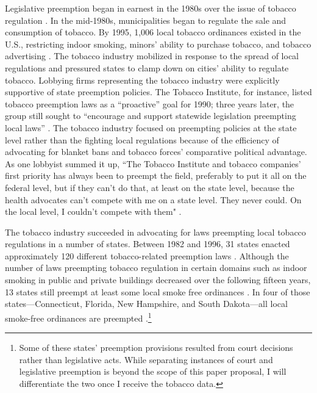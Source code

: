\documentclass[12pt]{article}
\begin{document}
Legislative preemption began in earnest in the 1980s over the issue of tobacco regulation \parencite{hicksHomeRuleBe2018,riverstone-newellRiseStatePreemption2017,nationalcancerinstituteStateLocalLegislative2000}. In the mid-1980s, municipalities began to regulate the sale and consumption of tobacco. By 1995, 1,006 local tobacco ordinances existed in the U.S., restricting indoor smoking, minors' ability to purchase tobacco, and tobacco advertising \parencite{siegelPreemptionTobaccoControl1997}. The tobacco industry mobilized in response to the spread of local regulations and pressured states to clamp down on cities' ability to regulate tobacco. Lobbying firms representing the tobacco industry were explicitly supportive of state preemption policies. The Tobacco Institute, for instance, listed tobacco preemption laws as a ``proactive'' goal for 1990; three years later, the group still sought to ``encourage and support statewide legislation preempting local laws'' \parencite[Quoted in][]{centersfordiseasecontrolPreemptiveStateTobaccoControl1999,nationalcancerinstituteStateLocalLegislative2000}. The tobacco industry focused on preempting policies at the state level rather than the fighting local regulations because of the efficiency of advocating for blanket bans and tobacco forces' comparative political advantage. As one lobbyist summed it up, ``The Tobacco Institute and tobacco companies' first priority has always been to preempt the field, preferably to put it all on the federal level, but if they can't do that, at least on the state level, because the health advocates can't compete with me on a state level. They never could. On the local level, I couldn't compete with them" \parencite{skolnickCancerConvertsTobacco1995}.

The tobacco industry succeeded in advocating for laws preempting local tobacco regulations in a number of states. Between 1982 and 1996, 31 states enacted approximately 120 different tobacco-related preemption laws \parencite{centersfordiseasecontrolPreemptiveStateTobaccoControl1999}. Although the number of laws preempting tobacco regulation in certain domains such as indoor smoking in public and private buildings decreased over the following fifteen years, 13 states still preempt at least some local smoke free ordinances \parencite{centersfordiseasecontrolStatePreemptionLocal2010}. In four of those states---Connecticut, Florida, New Hampshire, and South Dakota---all local smoke-free ordinances are preempted \parencite{centersfordiseasecontrolStatePreemptionLocal2010}.\footnote{Some of these states' preemption provisions resulted from court decisions rather than legislative acts. While separating instances of court and legislative preemption is beyond the scope of this paper proposal, I will differentiate the two once I receive the tobacco data.}
\end{document}
